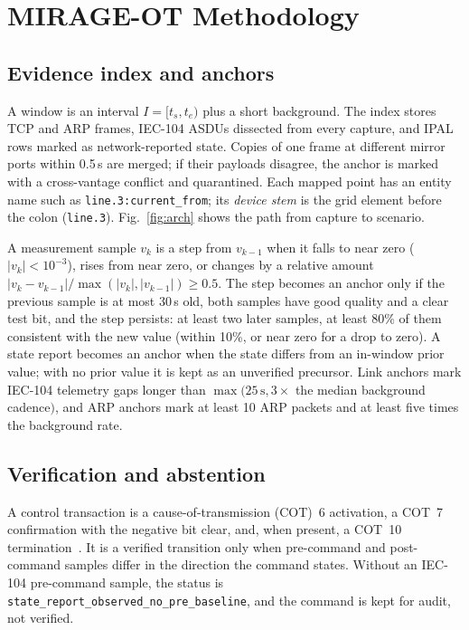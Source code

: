 \documentclass[conference]{IEEEtran}
\begin{document}
\section{MIRAGE-OT Methodology}
\subsection{Evidence index and anchors}
A window is an interval $I=[t_s,t_e)$ plus a short background.
The index stores TCP and ARP frames, IEC-104 ASDUs dissected from every capture, and IPAL rows marked as network-reported state.
Copies of one frame at different mirror ports within 0.5\,s are merged; if their payloads disagree, the anchor is marked with a cross-vantage conflict and quarantined.
Each mapped point has an entity name such as \texttt{line.3:current\_from}; its \emph{device stem} is the grid element before the colon (\texttt{line.3}).
Fig.~\ref{fig:arch} shows the path from capture to scenario.

A measurement sample $v_k$ is a step from $v_{k-1}$ when it falls to near zero ($|v_k|<10^{-3}$), rises from near zero, or changes by a relative amount $|v_k-v_{k-1}|/\max(|v_k|,|v_{k-1}|)\ge 0.5$.
The step becomes an anchor only if the previous sample is at most 30\,s old, both samples have good quality and a clear test bit, and the step persists: at least two later samples, at least 80\% of them consistent with the new value (within 10\%, or near zero for a drop to zero).
A state report becomes an anchor when the state differs from an in-window prior value; with no prior value it is kept as an unverified precursor.
Link anchors mark IEC-104 telemetry gaps longer than $\max(25\,\mathrm{s}, 3\times$ the median background cadence$)$, and ARP anchors mark at least 10 ARP packets and at least five times the background rate.

\subsection{Verification and abstention}
A control transaction is a cause-of-transmission (COT)~6 activation, a COT~7 confirmation with the negative bit clear, and, when present, a COT~10 termination~\cite{iec60870}.
It is a verified transition only when pre-command and post-command samples differ in the direction the command states.
Without an IEC-104 pre-command sample, the status is \texttt{state\_report\_observed\_no\_pre\_baseline}, and the command is kept for audit, not verified.
\end{document}
